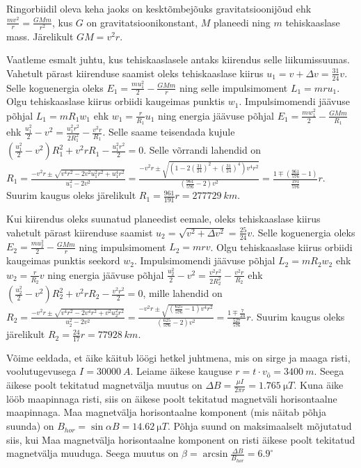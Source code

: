 \documentclass[10pt]{article}
\begin{document}
Ringorbiidil oleva keha jaoks on kesktõmbejõuks gravitatsioonijõud ehk $\frac{mv^2}{r}=\frac{GMm}{r^2}$, kus $G$ on gravitatsioonikonstant, $M$ planeedi ning $m$ tehiskaaslase mass. Järelikult $GM=v^2r$.

Vaatleme esmalt juhtu, kus tehiskaaslasele antaks kiirendus selle liikumissuunas. Vahetult pärast kiirenduse saamist oleks tehiskaaslase kiirus $u_1=v+\Delta v=\frac{31}{24}v$. Selle koguenergia oleks $E_1=\frac{mu_1^2}{2}-\frac{GMm}{r}$ ning selle impulsimoment $L_1=mru_1$. Olgu tehiskaaslase kiirus orbiidi kaugeimas punktis $w_1$. Impulsimomendi jäävuse põhjal $L_1=mR_1w_1$ ehk $w_1=\frac{r}{R_1}u_1$ ning energia jäävuse põhjal $E_1=\frac{mw_1^2}{2}-\frac{GMm}{R_1}$ ehk $\frac{u_1^2}{2}-v^2=\frac{u_1^2r^2}{2R_1^2}-\frac{v^2r}{R_1}$. Selle saame teisendada kujule $\left(\frac{u_1^2}{2}-v^2\right)R_1^2+v^2rR_1-\frac{u_1^2r^2}{2}=0$. Selle võrrandi lahendid on $R_1=\frac{-v^2r\pm\sqrt{v^4r^2-2v^2u_1^2r^2+u_1^4r^2}}{u_1^2-2v^2}=\frac{-v^2r\pm\sqrt{\left(1-2\left(\frac{31}{24}\right)^2+\left(\frac{31}{24}\right)^4\right)v^4r^2}}{\left(\frac{961}{576}-2\right)v^2}=\frac{1\mp\left(\frac{961}{576}-1\right)}{\frac{191}{576}}r$. Suurim kaugus oleks järelikult $R_1=\frac{961}{191}r=\SI{277729}{km}$.

Kui kiirendus oleks suunatud planeedist eemale, oleks tehiskaaslase kiirus vahetult pärast kiirenduse saamist $u_2=\sqrt{v^2+\Delta v^2}=\frac{25}{24}v$. Selle koguenergia oleks $E_2=\frac{mu_2^2}{2}-\frac{GMm}{r}$ ning impulsimoment $L_2=mrv$. Olgu tehiskaaslase kiirus orbiidi kaugeimas punktis seekord $w_2$. Impulsimomendi jäävuse põhjal $L_2=mR_2w_2$ ehk $w_2=\frac{r}{R_2}v$ ning energia jäävuse põhjal $\frac{u_2^2}{2}-v^2=\frac{v^2r^2}{2R_2^2}-\frac{v^2r}{R_2}$ ehk $\left(\frac{u_2^2}{2}-v^2\right)R_2^2+v^2rR_2-\frac{v^2r^2}{2}=0$, mille lahendid on $R_2=\frac{-v^2r\pm\sqrt{v^4r^2-2v^4r^2+v^2u_2^2r^2}}{u_2^2-2v^2}=\frac{-v^2r\pm\sqrt{\left(\frac{625}{576}-1\right)v^4r^2}}{\left(\frac{625}{576}-2\right)v^2}=\frac{1\mp\frac{7}{24}}{\frac{527}{576}}r$. Suurim kaugus oleks järelikult $R_2=\frac{24}{17}r=\SI{77928}{km}$.
\probend
\bigskip


\solu
Võime eeldada, et äike käitub löögi hetkel juhtmena, mis on sirge ja maaga risti, voolutugevusega $I = \SI{30000}{A}$. Leiame äikese kauguse $r = t\cdot v_{õ} = \SI{3400}{m}$. Seega äikese poolt tekitatud magnetvälja muutus on $\Delta B = \frac{\mu I}{2\pi r} = \SI{1.765}{\micro T}$. Kuna äike lööb maapinnaga risti, siis on äikese poolt tekitatud magnetväli horisontaalne maapinnaga. Maa magnetvälja horisontaalne komponent (mis näitab põhja suunda) on $B_{hor} = \sin{\alpha}B = \SI{14.62}{\micro T}$. Põhja suund on maksimaalselt mõjutatud siis, kui Maa magnetvälja horisontaalne komponent on risti äikese poolt tekitatud magnetvälja muuduga. Seega muutus on $\beta = \arcsin{\frac{\Delta B}{B_{hor}}} = 6.9^{\circ}$
\probend
\bigskip
\end{document}
